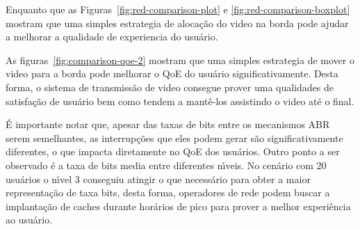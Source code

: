 Enquanto que as Figuras~\ref{fig:red-comparison-plot} e \ref{fig:red-comparison-boxplot} mostram que uma simples estrategia de alocação do video na borda pode ajudar a melhorar a qualidade de experiencia do usuário.

As figuras~\ref{fig:comparison-qoe-2} mostram que uma simples estrategia de mover o video para a borda pode melhorar o QoE do usuário significativamente. Desta forma, o sistema de transmissão de video consegue  prover uma qualidades de satisfação de usuário bem como tendem a mantê-los assistindo o video até o final.

É importante notar que, apesar das taxas de bits entre os mecanismos ABR serem semelhantes, as interrupções que eles podem gerar são significativamente diferentes, o que impacta diretamente no QoE dos usuários. Outro ponto a ser observado é a taxa de bits media entre diferentes nı́veis. No cenário com 20 usuários o nı́vel 3 conseguiu atingir o que necessário para obter a maior representação de taxa bits, desta forma, operadores de rede podem buscar a implantação de caches durante horários de pico para prover a melhor experiência ao usuário.